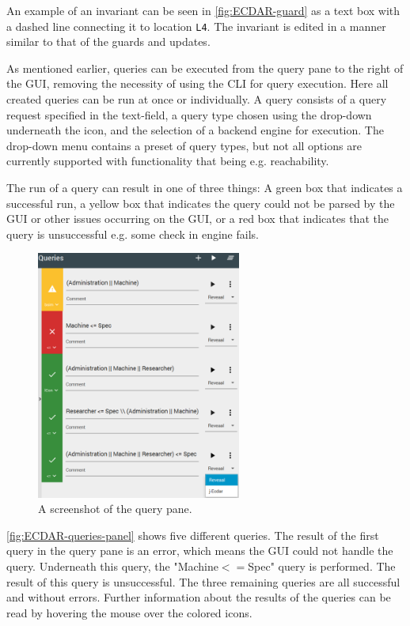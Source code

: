 An example of an invariant can be seen in \autoref{fig:ECDAR-guard} as a text box with a dashed line connecting it to location \texttt{L4}. The invariant is edited in a manner similar to that of the guards and updates. 

As mentioned earlier, queries can be executed from the query pane to the right of the GUI, removing the necessity of using the CLI for query execution. Here all created queries can be run at once or individually. A query consists of a query request specified in the text-field, a query type chosen using the drop-down underneath the icon, and the selection of a backend engine for execution. The drop-down menu contains a preset of query types, but not all options are currently supported with functionality that being e.g. reachability. 

The run of a query can result in one of three things: A green box that indicates a successful run, a yellow box that indicates the query could not be parsed by the GUI or other issues occurring on the GUI, or a red box that indicates that the query is unsuccessful e.g. some check in engine fails.

\begin{figure}[H]
    \centering
    \includegraphics[width=0.6\textwidth]{common/figures/right-panel.png}
    \caption{A screenshot of the query pane.}
    \label{fig:ECDAR-queries-panel}
\end{figure}

\autoref{fig:ECDAR-queries-panel} shows five different queries. 
The result of the first query in the query pane is an error, which means the GUI could not handle the query. 
Underneath this query, the "Machine$<=$Spec" query is performed. The result of this query is unsuccessful.
The three remaining queries are all successful and without errors.
Further information about the results of the queries can be read by hovering the mouse over the colored icons.


